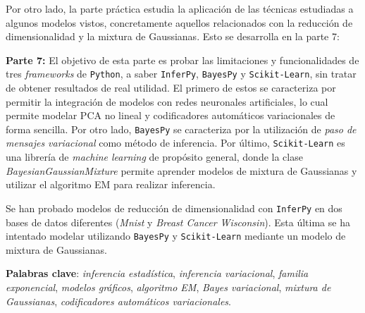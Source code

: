 Por otro lado, la parte práctica estudia la aplicación de las técnicas estudiadas a algunos modelos vistos, concretamente aquellos relacionados con la reducción de dimensionalidad y la mixtura de Gaussianas. Esto se desarrolla en la parte 7:

\textbf{Parte 7:} El objetivo de esta parte es probar las limitaciones y funcionalidades de tres \textit{frameworks} de \texttt{Python}, a saber \texttt{InferPy}, \texttt{BayesPy} y \texttt{Scikit-Learn}, sin tratar de obtener resultados de real utilidad. El primero de estos se caracteriza por permitir la integración de modelos con redes neuronales artificiales, lo cual permite modelar PCA no lineal y codificadores automáticos variacionales de forma sencilla. Por otro lado, \texttt{BayesPy} se caracteriza por la utilización de \emph{paso de mensajes variacional} como método de inferencia. Por último, \texttt{Scikit-Learn} es una librería de \emph{machine learning} de propósito general, donde la clase \emph{BayesianGaussianMixture} permite aprender modelos de mixtura de Gaussianas y utilizar el algoritmo EM para realizar inferencia.

Se han probado modelos de reducción de dimensionalidad con \texttt{InferPy} en dos bases de datos diferentes (\emph{Mnist} y \emph{Breast Cancer Wisconsin}). Esta última se ha intentado modelar utilizando \texttt{BayesPy} y \texttt{Scikit-Learn} mediante un modelo de mixtura de Gaussianas.

\textbf{Palabras clave}: \emph{inferencia estadística}, \emph{inferencia variacional}, \emph{familia exponencial}, \emph{modelos gráficos}, \emph{algoritmo EM}, \emph{Bayes variacional}, \emph{mixtura de Gaussianas}, \emph{codificadores automáticos variacionales}.
